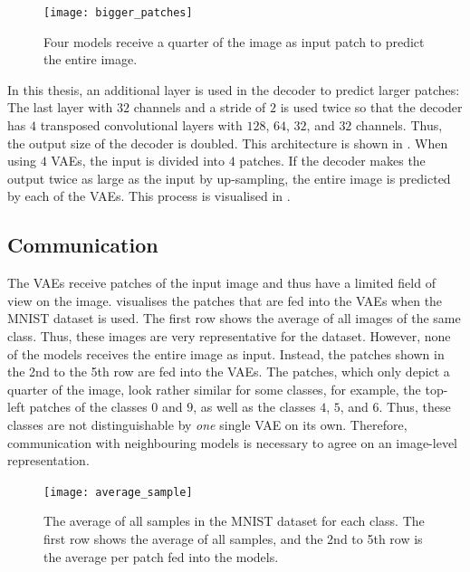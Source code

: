 \begin{figure}[h]
    \centering
    \texttt{[image: bigger\_patches]}
    \caption[Reconstruction of bigger output than input patches]{Four models receive a quarter of the image as input patch to predict the entire image.}
\end{figure}

In this thesis, an additional layer is used in the decoder to predict larger patches: The last layer with $32$ channels and a stride of $2$ is used twice so that the decoder has $4$ transposed convolutional layers with $128$, $64$, $32$, and $32$ channels. Thus, the output size of the decoder is doubled. This architecture is shown in .
When using $4$ VAEs, the input is divided into $4$ patches. If the decoder makes the output twice as large as the input by up-sampling,  the entire image is predicted by each of the VAEs. This process is visualised in .




\subsection{Communication}
The VAEs receive patches of the input image and thus have a limited field of view on the image.
 visualises the patches that are fed into the VAEs when the MNIST dataset \cite{Lecun_Bottou_Bengio_Haffner_1998} is used.
The first row shows the average of all images of the same class. Thus, these images are very representative for the dataset.
However, none of the models receives the entire image as input. Instead, the patches shown in the 2nd to the 5th row are fed into the VAEs.
The patches, which only depict a quarter of the image, look rather similar for some classes, for example, the top-left patches of the classes $0$ and $9$, as well as the classes $4$, $5$, and $6$.
Thus, these classes are not distinguishable by \emph{one} single VAE on its own.
Therefore, communication with neighbouring models is necessary to agree on an image-level representation.

\begin{figure}[h]
    \centering
    \texttt{[image: average\_sample]}
    \caption[Average sample of the MNIST dataset per class]{The average of all samples in the MNIST dataset for each class. The first row shows the average of all samples, and the 2nd to 5th row is the average per patch fed into the models.}
\end{figure}


